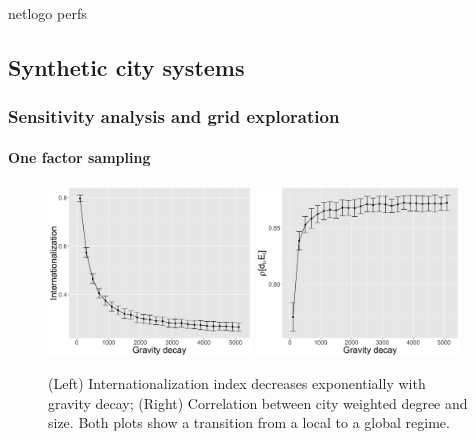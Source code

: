 \documentclass{article}
\begin{document}
\cite{railsback2017improving} netlogo perfs 

\subsection{Synthetic city systems}

\subsubsection{Sensitivity analysis and grid exploration}

\paragraph{One factor sampling}


\begin{figure}
	\includegraphics[width=0.48\textwidth]{figures/internationalization-gravityDecay_errorbars.png}
    \includegraphics[width=0.48\textwidth]{figures/rhoDegreeSize-gravityDecay_errorbars.png}
    \caption{(Left) Internationalization index decreases exponentially with gravity decay; (Right) Correlation between city weighted degree and size. Both plots show a transition from a local to a global regime.}
\end{figure}
\end{document}
